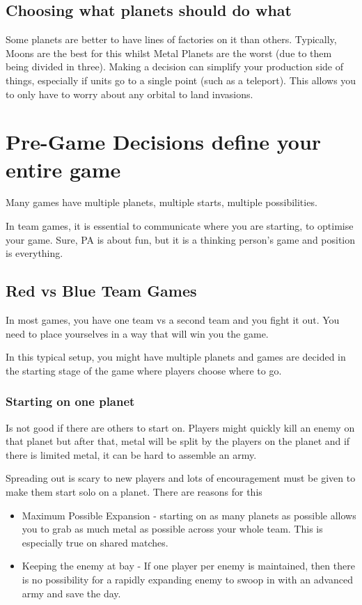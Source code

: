 \documentclass[]{article}
\begin{document}
\subsection{Choosing what planets should do what}  

Some planets are better to have lines of factories on it than others.  Typically, Moons are the best for this whilst Metal Planets are the worst (due to them being divided in three).  Making a decision can simplify your production side of things, especially if units go to a single point (such as a teleport).  This allows you to only have to worry about any orbital to land invasions.  
 
\newpage
\section{Pre-Game Decisions define your entire game}

Many games have multiple planets, multiple starts, multiple possibilities.  

In team games, it is essential to communicate where you are starting, to optimise your game.  Sure, PA is about fun, but it is a thinking person's game and position is everything.  

\subsection{Red vs Blue Team Games}

In most games, you have one team vs a second team and you fight it out.  You need to place yourselves in a way that will win you the game.  

In this typical setup, you might have multiple planets and games are decided in the starting stage of the game where players choose where to go.  

\subsubsection{Starting on one planet}

Is not good if there are others to start on.  Players might quickly kill an enemy on that planet but after that, metal will be split by the players on the planet and if there is limited metal, it can be hard to assemble an army.  

Spreading out is scary to new players and lots of encouragement must be given to make them start solo on a planet.  There are reasons for this

\begin{itemize}
	\item Maximum Possible Expansion - starting on as many planets as possible allows you to grab as much metal as possible across your whole team.  This is especially true on shared matches.  
	\item Keeping the enemy at bay - If one player per enemy is maintained, then there is no possibility for a rapidly expanding enemy to swoop in with an advanced army and save the day.  
\end{itemize}
\end{document}
